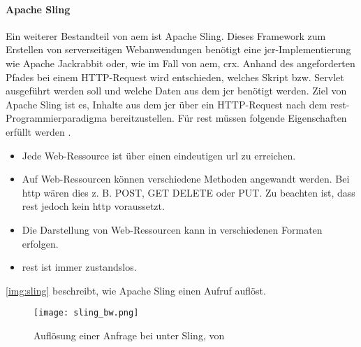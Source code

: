\paragraph{Apache Sling}
\label{sec:sling}
Ein weiterer Bestandteil von \ac{aem} ist Apache Sling. Dieses Framework zum Erstellen von serverseitigen Webanwendungen benötigt eine \ac{jcr}-Implementierung wie Apache Jackrabbit oder, wie im Fall von \ac{aem}, \ac{crx}. 
Anhand des angeforderten Pfades bei einem HTTP-Request wird entschieden, welches Skript bzw. Servlet ausgeführt werden soll und welche Daten aus dem \ac{jcr} benötigt werden. Ziel von Apache Sling ist es, Inhalte aus dem \ac{jcr} über ein HTTP-Request nach dem \ac{rest}-Programmierparadigma bereitzustellen. Für \ac{rest} müssen folgende Eigenschaften erfüllt werden \cite[S. 82 f.]{ste15}.		

\begin{itemize}
	\item Jede Web-Ressource ist über einen eindeutigen \ac{url} zu erreichen.
	\item Auf Web-Ressourcen können verschiedene Methoden angewandt werden. Bei \ac{http} wären dies z. B. POST, GET DELETE oder PUT. Zu beachten ist, dass \ac{rest} jedoch kein \ac{http} voraussetzt.
	\item Die Darstellung von Web-Ressourcen kann in verschiedenen Formaten erfolgen.
	\item \ac{rest} ist immer zustandslos.
\end{itemize}

\autoref{img:sling} beschreibt, wie Apache Sling einen Aufruf auflöst. 

\begin{figure}[H]
	\begin{center}
		\texttt{[image: sling\_bw.png]}
		\caption{Auflösung einer Anfrage bei unter Sling, von \cite{adobe_sling}}
		\label{img:sling}
	\end{center}
\end{figure}


